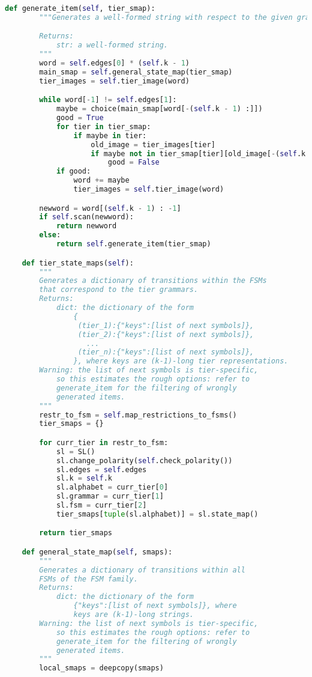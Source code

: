 \begin{lstlisting}[language=Python]
    def generate_item(self, tier_smap):
        """Generates a well-formed string with respect to the given grammar.

        Returns:
            str: a well-formed string.
        """
        word = self.edges[0] * (self.k - 1)
        main_smap = self.general_state_map(tier_smap)
        tier_images = self.tier_image(word)

        while word[-1] != self.edges[1]:
            maybe = choice(main_smap[word[-(self.k - 1) :]])
            good = True
            for tier in tier_smap:
                if maybe in tier:
                    old_image = tier_images[tier]
                    if maybe not in tier_smap[tier][old_image[-(self.k - 1) :]]:
                        good = False
            if good:
                word += maybe
                tier_images = self.tier_image(word)

        newword = word[(self.k - 1) : -1]
        if self.scan(newword):
            return newword
        else:
            return self.generate_item(tier_smap)

    def tier_state_maps(self):
        """
        Generates a dictionary of transitions within the FSMs
        that correspond to the tier grammars.
        Returns:
            dict: the dictionary of the form
                {
                 (tier_1):{"keys":[list of next symbols]},
                 (tier_2):{"keys":[list of next symbols]},
                   ...
                 (tier_n):{"keys":[list of next symbols]},
                }, where keys are (k-1)-long tier representations.
        Warning: the list of next symbols is tier-specific,
            so this estimates the rough options: refer to
            generate_item for the filtering of wrongly
            generated items.
        """
        restr_to_fsm = self.map_restrictions_to_fsms()
        tier_smaps = {}

        for curr_tier in restr_to_fsm:
            sl = SL()
            sl.change_polarity(self.check_polarity())
            sl.edges = self.edges
            sl.k = self.k
            sl.alphabet = curr_tier[0]
            sl.grammar = curr_tier[1]
            sl.fsm = curr_tier[2]
            tier_smaps[tuple(sl.alphabet)] = sl.state_map()

        return tier_smaps

    def general_state_map(self, smaps):
        """
        Generates a dictionary of transitions within all
        FSMs of the FSM family.
        Returns:
            dict: the dictionary of the form
                {"keys":[list of next symbols]}, where 
                keys are (k-1)-long strings.
        Warning: the list of next symbols is tier-specific,
            so this estimates the rough options: refer to
            generate_item for the filtering of wrongly
            generated items.
        """
        local_smaps = deepcopy(smaps)


\end{lstlisting}
